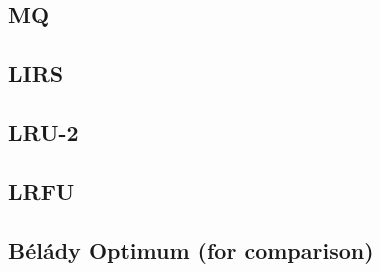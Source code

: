 \subsection{MQ}

\subsection{LIRS}

\subsection{LRU-2}

\subsection{LRFU}

\subsection{Bélády Optimum (for comparison)}

\lipsum[1-2]